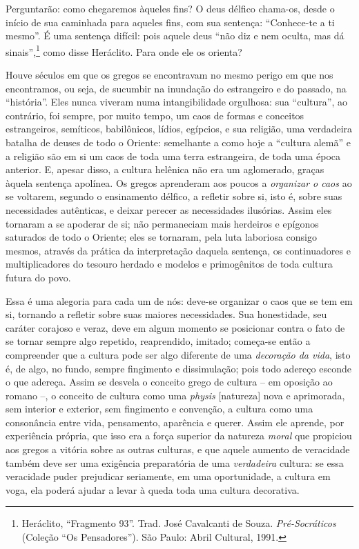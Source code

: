     Perguntarão: como chegaremos àqueles fins? O deus délfico chama-os,
    desde o início de sua caminhada para aqueles fins, com sua sentença:
    ``Conhece-te a ti mesmo''. É uma sentença difícil: pois aquele deus
    ``não diz e nem oculta, mas dá sinais'',\footnote{Heráclito,
      ``Fragmento 93''. Trad. José Cavalcanti de Souza.
      \emph{Pré-Socráticos} (Coleção ``Os Pensadores''). São Paulo:
      Abril Cultural, 1991.} como disse Heráclito. Para onde ele os
    orienta?

    Houve séculos em que os gregos se encontravam no mesmo perigo em que
    nos encontramos, ou seja, de sucumbir na inundação do estrangeiro e
    do passado, na ``história''. Eles nunca viveram numa intangibilidade
    orgulhosa: sua ``cultura'', ao contrário, foi sempre, por muito
    tempo, um caos de formas e conceitos estrangeiros, semíticos,
    babilônicos, lídios, egípcios, e sua religião, uma verdadeira
    batalha de deuses de todo o Oriente: semelhante a como hoje a
    ``cultura alemã'' e a religião são em si um caos de toda uma terra
    estrangeira, de toda uma época anterior. E, apesar disso, a cultura
    helênica não era um aglomerado, graças àquela sentença apolínea. Os
    gregos aprenderam aos poucos a \emph{organizar o caos} ao se
    voltarem, segundo o ensinamento délfico, a refletir sobre si, isto
    é, sobre suas necessidades autênticas, e deixar perecer as
    necessidades ilusórias.\label{necessidadesilusorias} Assim eles tornaram a se apoderar de si; não
    permaneciam mais herdeiros e epígonos saturados de todo o Oriente;
    eles se tornaram, pela luta laboriosa consigo mesmos, através da
    prática da interpretação daquela sentença, os continuadores e
    multiplicadores do tesouro herdado e modelos e primogênitos de toda
    cultura futura do povo.

    Essa é uma alegoria para cada um de nós: deve-se organizar o caos
    que se tem em si, tornando a refletir sobre suas maiores
    necessidades. Sua honestidade, seu caráter corajoso e veraz, deve em
    algum momento se posicionar contra o fato de se tornar sempre algo
    repetido, reaprendido, imitado; começa-se então a compreender que a
    cultura pode ser algo diferente de uma \emph{decoração da vida},
    isto é, de algo, no fundo, sempre fingimento e dissimulação; pois
    todo adereço esconde o que adereça. Assim se desvela o conceito
    grego de cultura -- em oposição ao romano --, o conceito de cultura
    como uma \emph{physis} {[}natureza{]} nova e aprimorada, sem
    interior e exterior, sem fingimento e convenção, a cultura como uma
    consonância entre vida, pensamento, aparência e querer. Assim ele
    aprende, por experiência própria, que isso era a força superior da
    natureza \emph{moral} que propiciou aos gregos a vitória sobre as
    outras culturas, e que aquele aumento de veracidade também deve ser
    uma exigência preparatória de uma \emph{verdadeira} cultura: se essa
    veracidade puder prejudicar seriamente, em uma oportunidade, a
    cultura em voga, ela poderá ajudar a levar à queda toda uma cultura
    decorativa.